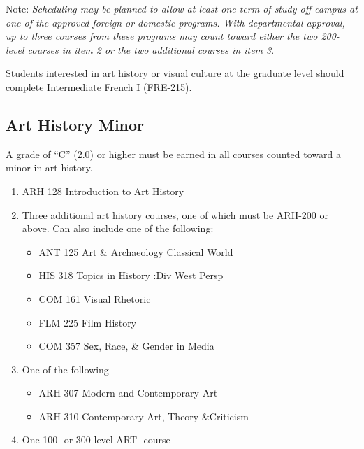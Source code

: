 \documentclass[
  letterpaper,
]{scrbook}
\providecommand{\tightlist}{%
  \setlength{\itemsep}{0pt}\setlength{\parskip}{0pt}}
\begin{document}
Note: \emph{Scheduling may be planned to allow at least one term of
study off-campus at one of the approved foreign or domestic programs.
With departmental approval, up to three courses from these programs may
count toward either the two 200-level courses in item 2 or the two
additional courses in item 3}.

Students interested in art history or visual culture at the graduate
level should complete Intermediate French I (FRE-215).

\subsection{Art History Minor}\label{art-history-minor}

A grade of ``C'' (2.0) or higher must be earned in all courses counted
toward a minor in art history.

\begin{enumerate}
\def\labelenumi{\arabic{enumi}.}
\tightlist
\item
  ARH 128 Introduction to Art History\\
\item
  Three additional art history courses, one of which must be ARH-200 or
  above. Can also include one of the following:

  \begin{itemize}
  \tightlist
  \item
    ANT 125 Art \& Archaeology Classical World\\
  \item
    HIS 318 Topics in History :Div West Persp\\
  \item
    COM 161 Visual Rhetoric\\
  \item
    FLM 225 Film History\\
  \item
    COM 357 Sex, Race, \& Gender in Media\\
  \end{itemize}
\item
  One of the following

  \begin{itemize}
  \tightlist
  \item
    ARH 307 Modern and Contemporary Art
  \item
    ARH 310 Contemporary Art, Theory \&Criticism\\
  \end{itemize}
\item
  One 100- or 300-level ART- course
\end{enumerate}
\end{document}
